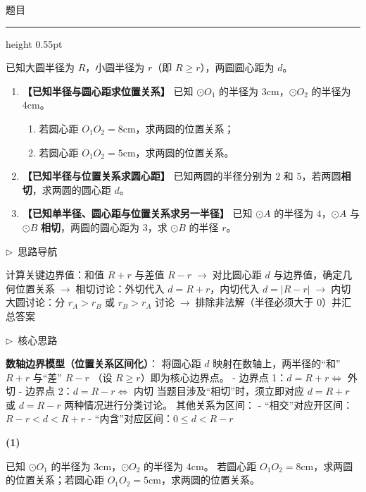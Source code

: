 \documentclass{exam-zh}
\newcommand{\edukai}{\kaishu}
\newenvironment{eduSubQuestionItem}[1]{%
  \needspace{4\baselineskip}%
  \vspace{2mm}
  \par\noindent
  \hangindent=8mm\hangafter=1
  {\color{edu-blue}\bfseries #1}\enspace
  \begingroup
  \color{edu-ink}
}{%
  \endgroup
  \par
  \vspace{3mm}
}
\newenvironment{eduAuxItem}[1]{%
  \needspace{4\baselineskip}%
  \vspace{2mm}
  \par\noindent
  \hangindent=8mm\hangafter=1
  {\color{edu-blue}\edukai $\triangleright$~#1}\enspace
  \begingroup
  \color{edu-ink}
  \edukai
}{%
  \endgroup
  \par
  \vspace{4mm}
}
\newenvironment{eduProblemBlock}[1][题目]{%
  \needspace{8\baselineskip}
  {\small\color{edu-muted}#1}\par
  \vspace{1.5mm}
  {\color{edu-blue}\hrule height 0.55pt}
  \vspace{4.5mm}
  \begingroup
  \color{edu-ink}
  \large
  \setlength{\parskip}{2.2mm}
  \linespread{1.20}\selectfont
}{%
  \par
  \endgroup
  \vspace{6mm}
}
\begin{document}
\begin{eduProblemBlock}[题目]
已知大圆半径为 $R$，小圆半径为 $r$（即 $R \ge r$），两圆圆心距为 $d$。
\begin{enumerate}[label=(\arabic*)]
  \item \textbf{【已知半径与圆心距求位置关系】} 已知 $\odot O_1$ 的半径为 $3\text{cm}$，$\odot O_2$ 的半径为 $4\text{cm}$。
  \begin{enumerate}[label=\arabic*.]
    \item 若圆心距 $O_1O_2 = 8\text{cm}$，求两圆的位置关系；
    \item 若圆心距 $O_1O_2 = 5\text{cm}$，求两圆的位置关系。
  \end{enumerate}
  \item \textbf{【已知半径与位置关系求圆心距】} 已知两圆的半径分别为 $2$ 和 $5$，若两圆\textbf{相切}，求两圆的圆心距 $d$。
  \item \textbf{【已知单半径、圆心距与位置关系求另一半径】} 已知 $\odot A$ 的半径为 $4$，$\odot A$ 与 $\odot B$ \textbf{相切}，两圆的圆心距为 $3$，求 $\odot B$ 的半径 $r$。
\end{enumerate}

\end{eduProblemBlock}









\begin{eduAuxItem}{思路导航}
计算关键边界值：和值 $R+r$ 与差值 $R-r$$\;\to\;$对比圆心距 $d$ 与边界值，确定几何位置关系$\;\to\;$相切讨论：外切代入 $d = R+r$，内切代入 $d = |R-r|$$\;\to\;$内切大圆讨论：分 $r_A > r_B$ 或 $r_B > r_A$ 讨论$\;\to\;$排除非法解（半径必须大于 0）并汇总答案\end{eduAuxItem}




\begin{eduAuxItem}{核心思路}
\textbf{数轴边界模型（位置关系区间化）}：
将圆心距 $d$ 映射在数轴上，两半径的“和” $R+r$ 与“差” $R-r$ （设 $R \ge r$）即为核心边界点。
- 边界点 1：$d = R + r \iff$ 外切
- 边界点 2：$d = R - r \iff$ 内切
当题目涉及“相切”时，须立即对应 $d = R+r$ 或 $d = R-r$ 两种情况进行分类讨论。
其他关系为区间：
- “相交”对应开区间：$R-r < d < R+r$
- “内含”对应区间：$0 \le d < R-r$
\end{eduAuxItem}




\begin{eduSubQuestionItem}{(1)}
已知 $\odot O_1$ 的半径为 $3\text{cm}$，$\odot O_2$ 的半径为 $4\text{cm}$。
若圆心距 $O_1O_2 = 8\text{cm}$，求两圆的位置关系；若圆心距 $O_1O_2 = 5\text{cm}$，求两圆的位置关系。
\end{eduSubQuestionItem}
\end{document}
